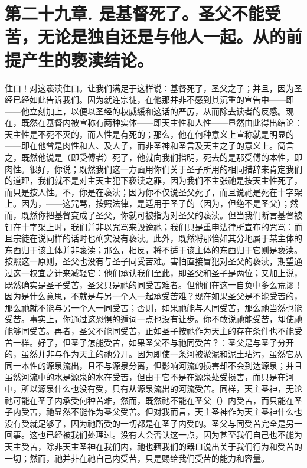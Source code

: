 
\section{第二十九章. 是基督死了。圣父不能受苦，无论是独自还是与他人一起。从的前提产生的亵渎结论。}

住口！对这亵渎住口。让我们满足于这样说：基督死了，圣父之子；并且，因为圣经已经如此告诉我们。因为就连宗徒，在他那并非不感到其沉重的宣告中——即——他立刻加上，以便以圣经的权威缓和这话的严厉，从而除去读者的反感。现在，既然在基督内被宣称有两种实体——即天主性和人性——显然由此得出结论：天主性是不死不灭的，而人性是有死的；那么，他在何种意义上宣称就是明显的——即在他曾是肉性和人、及人子，而非圣神和圣言及天主之子的意义上。简言之，既然他说是（即受傅者）死了，他就向我们指明，死去的是那受傅的本性，即肉性。很好，你说；既然我们这一方面用你们关于圣子所用的相同措辞来肯定我们的道理，我们就不是对主天主犯下亵渎之罪，因为我们不主张祂是按天主性死了，而只是按人性。不，你是在亵渎；因为你不仅说圣父死了，而且说祂是死在十字架上。因为，——这咒骂，按照法律，是适用于圣子的（因为，但绝不是圣父）；然而，既然你把基督变成了圣父，你就可被指为对圣父的亵渎。但当我们断言基督被钉在十字架上时，我们并非以咒骂来毁谤祂；我们只是重申法律所宣布的咒骂：而且宗徒在说同样的话时也确实没有亵渎。此外，既然将那恰如其分地属于某主体的东西归于该主体并非亵渎；那么，相反，将不适于该主体的东西归于它则是亵渎。按照这一原则，圣父也没有与圣子同受苦难。害怕直接冒犯对圣父的亵渎，期望通过这一权宜之计来减轻它：他们承认我们至此，即圣父和圣子是两位；又加上说，既然确实是圣子受苦，圣父只是祂的同受苦难者。但他们在这一自负中多么荒谬！因为是什么意思，不就是与另一个人一起承受苦难？现在如果圣父是不能受苦的，那么祂就不能与另一个人一同受苦；否则，如果祂能与人同受苦，那么祂当然也能受苦。事实上，你通过这恐惧的遁词一点也没有让步。你不敢说祂能受苦，却使祂能够同受苦。再者，圣父不能同受苦，正如圣子按祂作为天主的存在条件也不能受苦一样。好了，但圣子怎能受苦，如果圣父不与祂同受苦？：圣父是与圣子分开的，虽然并非与作为天主的祂分开。因为即使一条河被淤泥和泥土玷污，虽然它从同一本性的源泉流出，且不与源泉分离，但影响河流的损害却不会到达源泉；并且虽然河流中的水是源泉的水在受苦，但由于它不是在源泉处受损害，而只是在河中，所以源泉什么也没有受，只有从源泉流出的河流受苦。同样，天主圣神，无论祂可能在圣子内承受何种苦难，然而，既然祂不能在圣父（）内受苦，而只能在圣子内受苦，祂显然不能作为圣父受苦。但对我而言，天主圣神作为天主圣神什么也没有受就足够了，因为祂所受的一切都是在圣子内受的。圣父与同受苦完全是另一回事。这也已经被我们处理过。没有人会否认这一点，因为甚至我们自己也不能为天主受苦，除非天主圣神在我们内，祂也藉我们的器皿说出关于我们行为和受苦的一切；然而，祂并非在祂自己内受苦，只是赐给我们受苦的能力和容量。\par

